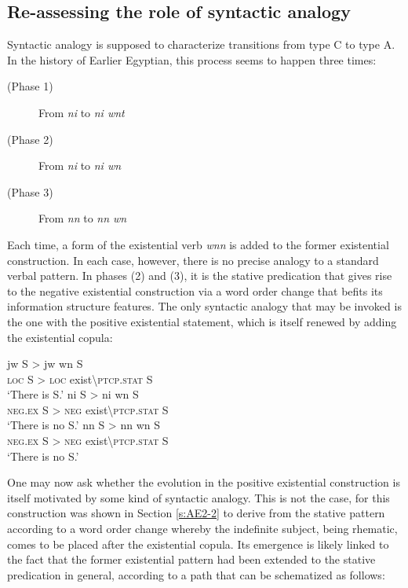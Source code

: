 \documentclass[output=paper]{langsci/langscibook}
\begin{document}
\subsection{Re-assessing the role of syntactic analogy}\label{s:AE4-1}

Syntactic analogy is supposed to characterize transitions from type C to type A. In the history of Earlier Egyptian, this process seems to happen three times:

\begin{description}
    \item[(Phase 1)] From \textit{ni} to \textit{ni wnt}
    \item[(Phase 2)] From \textit{ni} to \textit{ni wn} 
    \item[(Phase 3)] From \textit{nn} to \textit{nn wn} 
\end{description}
 
Each time, a form of the existential verb \textit{wnn} is added to the former existential construction. In each case, however, there is no precise analogy to a standard verbal pattern. In phases (2) and (3), it is the stative predication that gives rise to the negative existential construction via a word order change that befits its information structure features. The only syntactic analogy that may be invoked is the one with the positive existential statement, which is itself renewed by adding the existential copula:  

\ea 
    \ea \label{ex:AE53a}
    \gll jw S > jw wn S\\ 
    \textsc{loc} S > \textsc{loc} exist\textbackslash\textsc{ptcp.stat} S\\ 
    \glt ‘There is S.’ 
    \ex \label{ex:AE53b}
    \gll ni S > ni wn S\\ 
    \textsc{neg.ex} S > \textsc{neg} exist\textbackslash\textsc{ptcp.stat} S\\
    \glt ‘There is no S.’ 
    \ex \label{ex:AE53ac}
    \glt nn S > nn wn S\\ 
    \textsc{neg.ex} S > \textsc{neg} exist\textbackslash\textsc{ptcp.stat} S\\ 
    \glt ‘There is no S.’
\z \z


One may now ask whether the evolution in the positive existential construction is itself motivated by some kind of syntactic analogy. This is not the case, for this construction was shown in Section \ref{s:AE2-2} to derive from the stative pattern according to a word order change whereby the indefinite subject, being rhematic, comes to be placed after the existential copula. Its emergence is likely linked to the fact that the former existential pattern had been extended to the stative predication in general, according to a path that can be schematized as follows: 
\end{document}
